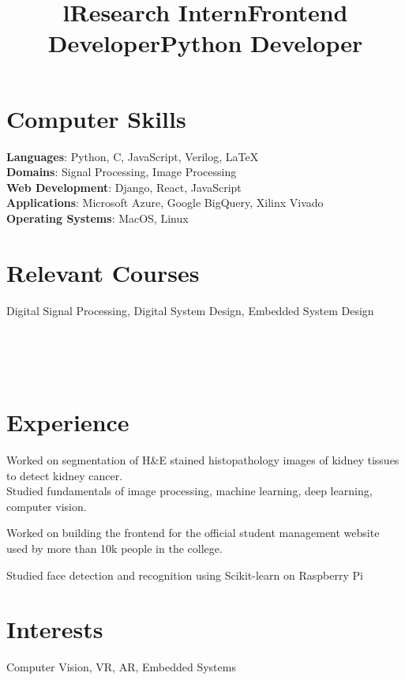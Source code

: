 \documentclass[margin]{res}
\begin{document}
\begin{resume}
    \section{Computer Skills}
      \textbf{Languages}: Python, C, JavaScript, Verilog, \LaTeX
      \\
      \textbf{Domains}: Signal Processing, Image Processing
      \\
      \textbf{Web Development}: Django, React, JavaScript
      \\
      \textbf{Applications}: Microsoft Azure, Google BigQuery, Xilinx Vivado
      \\
      \textbf{Operating Systems}: MacOS, Linux

    \section{Relevant Courses}
      Digital Signal Processing, Digital System Design, Embedded System Design

    \begin{format}
      \title{l}\\
      \\
      \body\\
    \end{format}

    \section{Experience}
      \title{\textbf{Research Intern}}
      \begin{position}
        Worked on segmentation of H\&E stained histopathology images of kidney tissues to detect kidney cancer.\\
        Studied fundamentals of image processing, machine learning, deep learning, computer vision.
      \end{position}

      \title{\textbf{Frontend Developer}}
      \begin{position}
        Worked on building the frontend for the official student management website used by more than 10k people in the college.
      \end{position}

      \title{\textbf{Python Developer}}
      \begin{position}
        Studied face detection and recognition using Scikit-learn on Raspberry Pi
      \end{position}

    \section{Interests}
      Computer Vision, VR, AR, Embedded Systems
  \end{resume}
\end{document}
